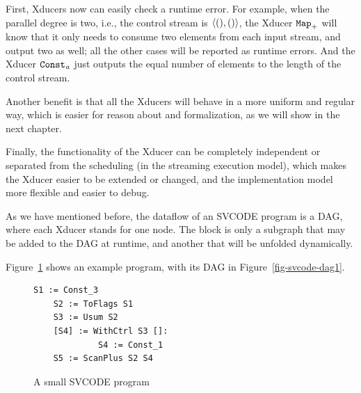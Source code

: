 First, Xducers now can easily check a runtime error. 
For example, when the parallel degree is two, i.e., the control stream is $\< (),() \'>$, the Xducer $\mathtt{Map}_{+}$ will know that it only needs to consume two elements from each input stream, and output two as well; all the other cases will be reported as runtime errors.  
And the Xducer $\mathtt{Const_{\mathit a}}$ just outputs the equal number of elements to the length of the control stream.

Another benefit is that all the Xducers will behave in a more uniform and regular way, which is easier for reason about and formalization, as we will show in the next chapter.

Finally, the functionality of the Xducer can be completely independent or separated from the scheduling (in the streaming execution model),  which makes the Xducer easier to be extended or changed,
and the implementation model more flexible and easier to debug. 


As we have mentioned before, the dataflow of an SVCODE program is a DAG, where each Xducer stands for one node. 
The \wc block is only a subgraph that may be added to the DAG at runtime,  
and \sc another that will be unfolded dynamically.

Figure~\ref{fig-svcode-eg1} shows an example program, with its DAG in Figure~\ref{fig-svcode-dag1}. \\

\begin{figure}[H]
	\begin{lstlisting}[style=svcode-style]
	S1 := Const_3
	S2 := ToFlags S1
	S3 := Usum S2
	[S4] := WithCtrl S3 []:
	         S4 := Const_1
	S5 := ScanPlus S2 S4
	\end{lstlisting}	
	\caption{A small SVCODE program \label{fig-svcode-eg1}}
\end{figure}
\hspace{1cm}


